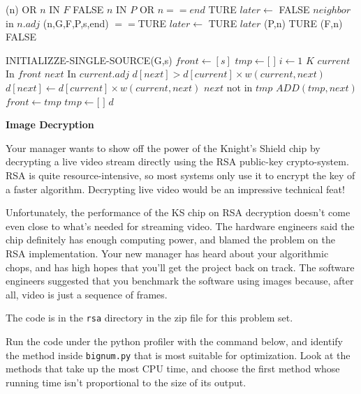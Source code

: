 \documentclass[12pt,twoside]{article}
\begin{document}
\begin{problems}
 
\begin{codebox}
\li \If {}(n) OR $n$ IN $F$\Do
\li \Return FALSE \End
\li \If $n$ IN $P$ OR $n==end$\Do
\li \Return TURE
\End
\li $later \gets$ FALSE
\li \For $neighbor$ in $n.adj$ \Do
\li \If {}(n,G,F,P,s,end) $==$TURE
\li $later \gets$ TURE \End
\li \If $later$ \Do
\li	 {}(P,n)
\li \Return TURE
\li \Else
\li  {}(F,n)
\li \Return FALSE
\End
\end{codebox}


\begin{codebox}
\li INITIALIZZE-SINGLE-SOURCE(G,s)
\li $front \gets [s]$
\li $tmp \gets [$ $]$
\li \For $i \gets 1$ \To $K$ \Do
\li \For $current$ In $front$ \Do
\li \For $next$ In $current.adj$ \Do
\li \If $d[next] > d[current]\times w(current,next)$ \Do 
\li $d[next] \gets d[current]\times w(current,next)$
\li \If $next$ not in $tmp$ \Do
\li $ADD(tmp,next)$ \End \End \End \End 
\li $front \gets tmp$
\li $tmp\gets[$ $]$\End
\li \Return $d$
\end{codebox}
\newpage

\problem {} \textbf{Image Decryption}

Your manager wants to show off the power of the Knight's Shield chip by
decrypting a live video stream directly using the RSA public-key crypto-system.
RSA is quite resource-intensive, so most systems only use it to encrypt the key
of a faster algorithm. Decrypting live video would be an impressive technical
feat!

Unfortunately, the performance of the KS chip on RSA decryption doesn't come
even close to what's needed for streaming video. The hardware engineers said the
chip definitely has enough computing power, and blamed the problem on the
RSA implementation. Your new manager has heard about your algorithmic chops, and
has high hopes that you'll get the project back on track. The software engineers
suggested that you benchmark the software using images because, after all, video
is just a sequence of frames.

The code is in the \texttt{rsa} directory in the zip file for this problem set.

\begin{problemparts}
\problempart {} Run the code under the python profiler with the command
below, and identify the method inside \texttt{bignum.py} that is most suitable
for optimization. Look at the methods that take up the most CPU time, and
choose the first method whose running time isn't proportional to the size of its
output.


\end{problemparts}
\end{problems}
\end{document}
